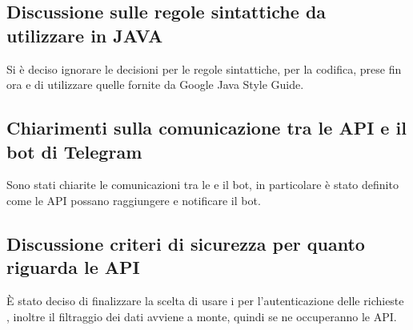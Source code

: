 	\subsection*{Discussione sulle regole sintattiche da utilizzare in JAVA}
		Si è deciso ignorare le decisioni per le regole sintattiche, per la codifica, prese fin ora e di utilizzare quelle fornite da Google Java Style Guide.

	\subsection*{Chiarimenti sulla comunicazione tra le API e il bot di Telegram}
		Sono stati chiarite le comunicazioni tra le  e il bot, in particolare è stato definito come le API possano raggiungere e notificare il bot.

	\subsection*{Discussione criteri di sicurezza per quanto riguarda le API}
		È stato deciso di finalizzare la scelta di usare i  per l'autenticazione delle richieste , inoltre il filtraggio dei dati avviene a monte, quindi se ne occuperanno le API.
